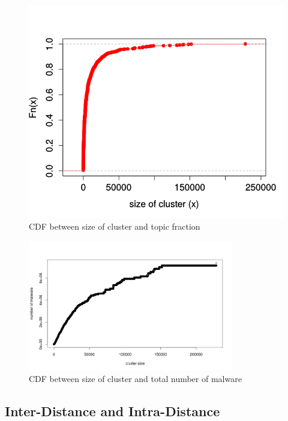 \begin{figure}[htbp]
\begin{center}
  \includegraphics[scale=0.5]{figures/ecdfclustersize.png}
\end{center}
\caption{CDF between size of cluster and topic fraction}
\label{fig:ecdfclustersize}
\end{figure}

\begin{figure}[htbp]
\begin{center}
  \includegraphics[scale=0.3,width=0.8\textwidth]{figures/cdfclusterlen2.png}
\end{center}
\caption{CDF between size of cluster and total number of malware}
\label{fig:cdfclusterlen}
\end{figure}
\subsection{Inter-Distance and Intra-Distance}
\label{sub:Inter-Distance and Intra-Distance}

